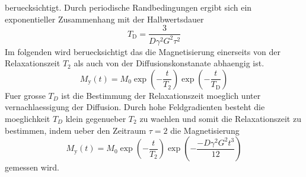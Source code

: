 beruecksichtigt. Durch periodische Randbedingungen ergibt sich ein exponentieller
Zusammenhang mit der Halbwertsdauer
\begin{equation}%
  \label{eq:diffkoef}
  T_\text{D} = \frac{3}{D \gamma^2 G^2 \tau^2}
\end{equation}
Im folgenden wird beruecksichtigt das die Magnetisierung einerseits von der
Relaxationszeit $T_2$ als auch von der Diffusionskonstanate abhaengig ist.
\begin{equation}
		\label{eq:my}
		M_\text{y}(t) = M_0 \exp \left( - \frac{t}{T_2} \right) \exp \left( -
		\frac{t}{T_\text{D}} \right)
\end{equation}
Fuer grosse $T_D$ ist die Bestimmung der Relaxationszeit moeglich unter
vernachlaessigung der Diffusion. 
Durch hohe Feldgradienten besteht die moeglichkeit $T_D$ klein gegenueber $T_2$
zu waehlen und somit die Relaxationszeit zu bestimmen, indem ueber den Zeitraum 
$\tau = 2$ die Magnetisierung
\begin{equation}
		\label{eq:magy}
		M_\text{y}(t) = M_0 \exp \left( - \frac{t}{T_2} \right) \exp \left( -
		\frac{-D \gamma^2 G^2 t^3}{12} \right)
\end{equation}
gemessen wird.
